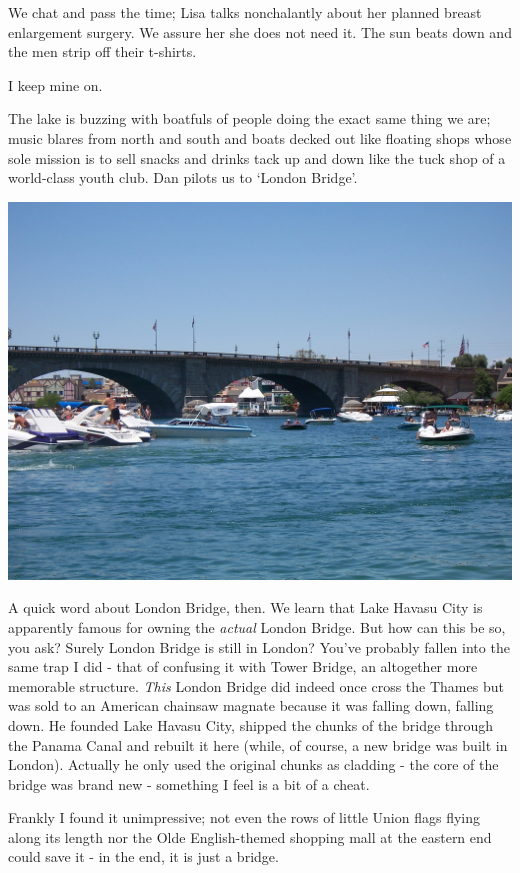 \documentclass[a5paper,titlepage,11pt]{book}
\begin{document}
We chat and pass the time; Lisa talks nonchalantly about her planned breast enlargement surgery. We assure her she does not need it. The sun beats down and the men strip off their t-shirts.

I keep mine on.

The lake is buzzing with boatfuls of people doing the exact same thing we are; music blares from north and south and boats decked out like floating shops whose sole mission is to sell snacks and drinks tack up and down like the tuck shop of a world-class youth club. Dan pilots us to `London Bridge'.

\begin{center}\includegraphics[width=\textwidth]{gfx/100_1598}\end{center}

A quick word about London Bridge, then. We learn that Lake Havasu City is apparently famous for owning the \emph{actual} London Bridge. But how can this be so, you ask?  Surely London Bridge is still in London?  You've probably fallen into the same trap I did - that of confusing it with Tower Bridge, an altogether more memorable structure. \emph{This} London Bridge did indeed once cross the Thames but was sold to an American chainsaw magnate because it was falling down, falling down. He founded Lake Havasu City, shipped the chunks of the bridge through the Panama Canal and rebuilt it here (while, of course, a new bridge was built in London). Actually he only used the original chunks as cladding - the core of the bridge was brand new - something I feel is a bit of a cheat.

Frankly I found it unimpressive; not even the rows of little Union flags flying along its length nor the Olde English-themed shopping mall at the eastern end could save it - in the end, it is just a bridge.
\end{document}

